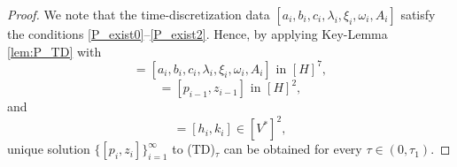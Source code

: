 \documentclass{sinst}
\numberwithin{equation}{section}
\theoremstyle{plain}
\theoremstyle{definition}
\begin{document}
\begin{proof}
  We note that the time-discretization data $[a_i, b_i, c_i, \lambda_i, \xi_i, \omega_i, A_i]$ satisfy the conditions \eqref{P_exist0}--\eqref{P_exist2}. Hence, by applying Key-Lemma \ref{lem:P_TD} with
  \begin{equation}
    [a^\circ, b^\circ, c^\circ, \lambda^\circ, \xi^\circ, \omega^\circ, A^\circ] = [a_i, b_i, c_i, \lambda_i, \xi_i, \omega_i, A_i] \mbox{ in } [H]^7,
  \end{equation}
  \begin{equation}
    [p^\dagger, z^\dagger] = [p_{i-1}, z_{i-1}] \mbox{ in } [H]^2,
  \end{equation}
  and
  \begin{equation}
    [h^\circ, k^\circ] = [h_i, k_i] \in [V^*]^2,
  \end{equation}
  unique solution $\{[p_i, z_i]\}_{i=1}^\infty$ to (TD)$_\tau$ can be obtained for every $\tau \in (0,\tau_1)$.


\end{proof}
\end{document}
